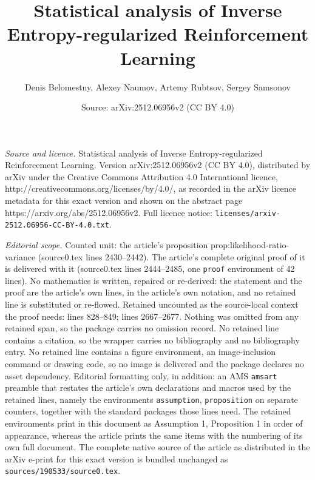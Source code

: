 \documentclass[10pt,a4paper]{amsart}
\title{Statistical analysis of Inverse Entropy-regularized Reinforcement Learning}
\author{Denis Belomestny, Alexey Naumov, Artemy Rubtsov, Sergey Samsonov}
\date{Source: arXiv:2512.06956v2 (CC BY 4.0)}
\begin{document}
\maketitle

\noindent\emph{Source and licence.} Statistical analysis of Inverse Entropy-regularized Reinforcement Learning. Version arXiv:2512.06956v2 (CC BY 4.0), distributed by arXiv under the Creative Commons Attribution 4.0 International licence, http://creativecommons.org/licenses/by/4.0/, as recorded in the arXiv licence metadata for this exact version and shown on the abstract page https://arxiv.org/abs/2512.06956v2. Full licence notice: \texttt{licenses/arxiv-2512.06956-CC-BY-4.0.txt}.\par\smallskip

\noindent\textit{Editorial scope.} Counted unit: the article's proposition prop:likelihood-ratio-variance (source0.tex lines 2430--2442). The article's complete original proof of it is delivered with it (source0.tex lines 2444--2485, one \texttt{proof} environment of 42 lines). No mathematics is written, repaired or re-derived: the statement and the proof are the article's own lines, in the article's own notation, and no retained line is substituted or re-flowed.  Retained uncounted as the source-local context the proof needs: lines 828--849; lines 2667--2677.  Nothing was omitted from any retained span, so the package carries no omission record.  No retained line contains a citation, so the wrapper carries no bibliography and no bibliography entry.  No retained line contains a figure environment, an image-inclusion command or drawing code, so no image is delivered and the package declares no asset dependency.  Editorial formatting only, in addition: an AMS \texttt{amsart} preamble that restates the article's own declarations and macros used by the retained lines, namely the environments \texttt{assumption}, \texttt{proposition} on separate counters, together with the standard packages those lines need.  The retained environments print in this document as Assumption 1, Proposition 1 in order of appearance, whereas the article prints the same items with the numbering of its own full document.  The complete native source of the article as distributed in the arXiv e-print for this exact version is bundled unchanged as \texttt{sources/190533/source0.tex}.
\end{document}
